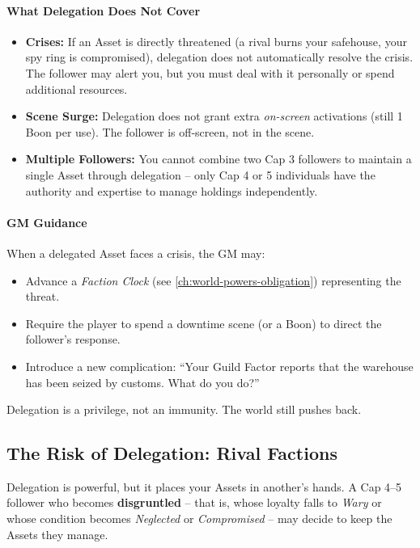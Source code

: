 \paragraph{What Delegation Does \textbf{Not} Cover}
\begin{itemize}
  \item \textbf{Crises:} If an Asset is directly threatened (a rival burns your safehouse, your spy ring is compromised), delegation does not automatically resolve the crisis. The follower may alert you, but you must deal with it personally or spend additional resources.
  \item \textbf{Scene Surge:} Delegation does not grant extra \emph{on-screen} activations (still 1 Boon per use). The follower is off‑screen, not in the scene.
  \item \textbf{Multiple Followers:} You cannot combine two Cap 3 followers to maintain a single Asset through delegation -- only Cap 4 or 5 individuals have the authority and expertise to manage holdings independently.
\end{itemize}

\paragraph{GM Guidance}
When a delegated Asset faces a crisis, the GM may:
\begin{itemize}
  \item Advance a \emph{Faction Clock} (see \ref{ch:world-powers-obligation}) representing the threat.
  \item Require the player to spend a downtime scene (or a Boon) to direct the follower's response.
  \item Introduce a new complication: ``Your Guild Factor reports that the warehouse has been seized by customs. What do you do?''
\end{itemize}
Delegation is a privilege, not an immunity. The world still pushes back.

\subsection*{The Risk of Delegation: Rival Factions}
\label{subsec:delegation-risk}

Delegation is powerful, but it places your Assets in another's hands. A Cap 4--5 follower who becomes \textbf{disgruntled} -- that is, whose loyalty falls to \emph{Wary} or whose condition becomes \emph{Neglected} or \emph{Compromised} -- may decide to keep the Assets they manage.

